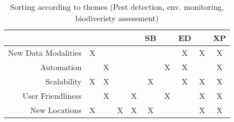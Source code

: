 \begin{table}
    \centering 
    \begin{tabular}{r|ccccccccc}
         & \cite{Geckeler2023a} & \cite{Geckeler2024a} &  \cite{Geckeler2022a} & \cite{Geckeler2023b} & SB & \cite{Geckeler2024} & ED & \cite{Kirchgeorg2024} & XP \\
         \hline \hline
         New Data Modalities   & X &   &   &   &   &   & X & X & X\\
         \hline
         Automation            &   & X &   &   &   & X & X &   & X\\
         \hline
         Scalability           & X & X &   &   & X &   & X &  X & X\\
         \hline
         User Friendliness     &   & X &   & X &   & X &   &  X & X\\
         \hline
         New Locations         & X &   & X & X & X &   &   &  X & X\\
    \end{tabular}
    \caption{Sorting according to themes (Pest detection, env. monitoring, biodiveristy assessment)}
    \label{tab:my_label}
\end{table}
